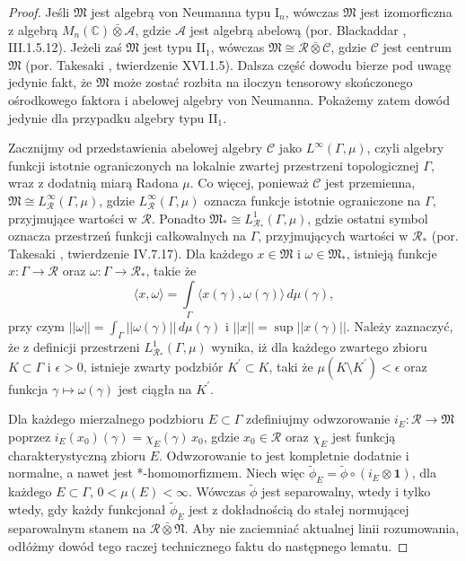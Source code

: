 \begin{proof}
Jeśli $\mathfrak{M}$ jest algebrą von Neumanna typu I$\phantom{}_{n}$,
wówczas $\mathfrak{M}$ jest izomorficzna z algebrą
$M_{n}(\mathbb{C}) \bar{\otimes} \mathcal{A}$,
gdzie $\mathcal{A}$ jest algebrą abelową
(por. Blackaddar \cite{Blackadar2006}, III.1.5.12).
Jeżeli zaś $\mathfrak{M}$ jest typu II$\phantom{}_{1}$,
wówczas $\mathfrak{M} \cong  \mathcal{R}\bar{\otimes}\mathcal{C}$,
gdzie $\mathcal{C}$ jest centrum $\mathfrak{M}$
(por. Takesaki \cite{Takesaki3}, twierdzenie XVI.1.5).
Dalsza część dowodu bierze pod uwagę jedynie fakt, że $\mathfrak{M}$
może zostać rozbita na iloczyn tensorowy skończonego ośrodkowego faktora i
abelowej algebry von Neumanna.
Pokażemy zatem dowód jedynie dla przypadku algebry typu II$\phantom{}_{1}$.

Zacznijmy od przedstawienia abelowej algebry $\mathcal{C}$ jako
$L^{\infty}(\Gamma, \mu)$, czyli algebry funkcji istotnie ograniczonych
na lokalnie zwartej przestrzeni topologicznej $\Gamma$,
wraz z dodatnią miarą Radona $\mu$.
Co więcej, ponieważ $\mathcal{C}$ jest przemienna,
$\mathfrak{M} \cong L^{\infty}_{\mathcal{R}}(\Gamma, \mu)$,
gdzie $L^{\infty}_{\mathcal{R}}(\Gamma, \mu)$  oznacza
funkcje istotnie ograniczone na $\Gamma$, przyjmujące wartości w $\mathcal{R}$.
Ponadto $\mathfrak{M}_{*} \cong L^{1}_{\mathcal{R}_{*}}(\Gamma, \mu)$,
gdzie ostatni symbol oznacza
przestrzeń funkcji całkowalnych na $\Gamma$, przyjmujących wartości w $\mathcal{R}_{*}$
(por. Takesaki \cite{Takesaki1}, twierdzenie IV.7.17).
Dla każdego $x \in \mathfrak{M}$ i $\omega \in \mathfrak{M}_{*}$,
istnieją funkcje $x:\Gamma\to\mathcal{R}$ oraz
$\omega:\Gamma\to\mathcal{R}_{*}$, takie że
\begin{equation}
\langle x, \omega \rangle =\int \limits_{\Gamma}
\langle x(\gamma), \omega(\gamma) \rangle \, d \mu(\gamma),
\end{equation}
przy czym $||\omega|| = \int_{\Gamma} ||\omega(\gamma)|| \, d \mu(\gamma)$
i $||x|| = \sup || x(\gamma) ||$.
Należy zaznaczyć, że z definicji przestrzeni $L^{1}_{\mathcal{R}_{*}}(\Gamma, \mu)$
wynika, iż dla każdego zwartego zbioru
$K \subset \Gamma$ i $\epsilon >0$,
istnieje zwarty podzbiór $K^{'} \subset K$,
taki że $\mu (K \setminus K^{'}) < \epsilon$
oraz funkcja $\gamma \mapsto \omega(\gamma)$ jest ciągła na $K^{'}$.

Dla każdego mierzalnego podzbioru $E \subset \Gamma$
zdefiniujmy odwzorowanie
$i_{E}: \mathcal{R} \rightarrow \mathfrak{M}$ poprzez
$i_{E}(x_{0})(\gamma) = \chi_{E}(\gamma) \, x_{0}$,
gdzie $x_{0} \in \mathcal{R}$
oraz $\chi_{E}$ jest funkcją charakterystyczną zbioru $E$.
Odwzorowanie to jest kompletnie dodatnie i normalne,
a nawet jest *-homomorfizmem.
Niech więc $\tilde{\phi}_{E} = \tilde{\phi} \circ (i_{E} \otimes \mathbf{1})$,
dla każdego $E \subset \Gamma$, $0<\mu(E)<\infty$.
Wówczas $\tilde{\phi}$ jest separowalny, wtedy i tylko wtedy, gdy
każdy funkcjonał $\tilde{\phi}_{E}$ jest z dokładnością do stałej
normującej separowalnym stanem na $\mathcal{R} \bar{\otimes} \mathfrak{N}$.
Aby nie zaciemniać aktualnej linii rozumowania,
odłóżmy dowód tego raczej technicznego faktu do następnego lematu.


\end{proof}

